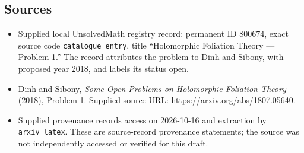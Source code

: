 \documentclass[11pt]{article}
\begin{document}
\subsection{Sources}
\begin{itemize}
\item Supplied local UnsolvedMath registry record: permanent ID \(800674\), exact source code \texttt{catalogue entry}, title ``Holomorphic Foliation Theory --- Problem 1.'' The record attributes the problem to Dinh and Sibony, with proposed year 2018, and labels its status open.
\item Dinh and Sibony, \emph{Some Open Problems on Holomorphic Foliation Theory} (2018), Problem 1. Supplied source URL: \url{https://arxiv.org/abs/1807.05640}.
\item Supplied provenance records access on 2026-10-16 and extraction by \texttt{arxiv\_latex}. These are source-record provenance statements; the source was not independently accessed or verified for this draft.
\end{itemize}
\end{document}
